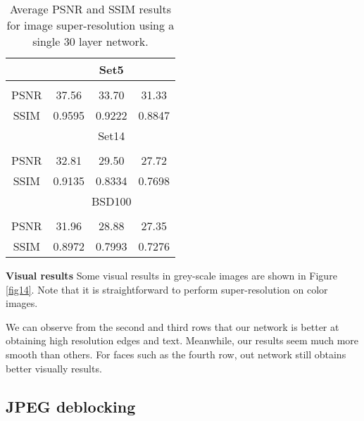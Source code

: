 \documentclass[10pt,journal,compsoc]{IEEEtran}
\begin{document}
\begin{table}[htb!]
\centering
\caption{Average PSNR and SSIM results for image super-resolution using a single 30 layer network.}
\begin{tabular}{c|c c c } \hline
       &\multicolumn{3}{c}{Set5}     \\ \hline
       &  &  &  \\ \hline
  PSNR &37.56    &33.70    &31.33    \\ \hline
  SSIM &0.9595   &0.9222   &0.8847   \\ \hline
       &\multicolumn{3}{c}{Set14}    \\ \hline
       &  &  &  \\ \hline
  PSNR &32.81    &29.50    &27.72    \\ \hline
  SSIM &0.9135   &0.8334   &0.7698   \\ \hline
       &\multicolumn{3}{c}{BSD100}   \\ \hline
       &  &  &  \\ \hline
  PSNR &31.96    &28.88    &27.35    \\ \hline
  SSIM &0.8972   &0.7993   &0.7276   \\ \hline
\end{tabular}
\label{table8}
\end{table}


{\bf{Visual results}} Some visual results in grey-scale images are shown in Figure \ref{fig14}.
Note that it is straightforward to perform super-resolution on color images.

We can observe from
the second and third rows that our network is better at obtaining high resolution edges
and text. Meanwhile, our results seem much more smooth than others. For faces such as
the fourth row, out network still obtains better visually results.

\begin{figure*}
\centering
\subfigure{\texttt{[image: 3-1]} }
\subfigure{\texttt{[image: 3-2]} }
\subfigure{\texttt{[image: 3-3]} }
\subfigure{\texttt{[image: 3-4]} }
\caption{Visual results of image super-resolution.
Images from left to right column are: High resolution image;
the recovered image of RED30, ARFL+, CSC, CSCN, NBSRF, SRCNN, TSE.}
\label{fig14}
\end{figure*}




\subsection{JPEG deblocking}
\end{document}
